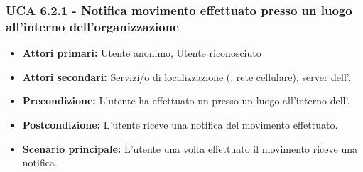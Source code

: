 \subsubsection{UCA 6.2.1 - Notifica movimento effettuato presso un luogo all'interno dell'organizzazione}
\begin{itemize}
	\item \textbf{Attori primari:} Utente anonimo, Utente riconosciuto
	\item \textbf{Attori secondari:} Servizi/o di localizzazione (, rete cellulare), server  dell'.
	\item \textbf{Precondizione:} L'utente ha effettuato un  presso un luogo all'interno dell'.
	\item \textbf{Postcondizione:} L'utente riceve una notifica del movimento effettuato.
	\item \textbf{Scenario principale:} L'utente una volta effettuato il movimento riceve una notifica.
\end{itemize}














